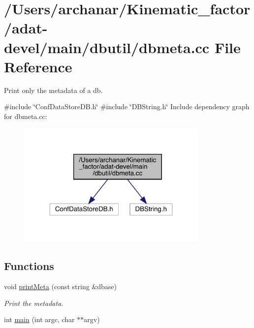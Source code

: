 \hypertarget{adat-devel_2main_2dbutil_2dbmeta_8cc}{}\section{/\+Users/archanar/\+Kinematic\+\_\+factor/adat-\/devel/main/dbutil/dbmeta.cc File Reference}
\label{adat-devel_2main_2dbutil_2dbmeta_8cc}


Print only the metadata of a db.  


{\ttfamily \#include \char`\"{}Conf\+Data\+Store\+D\+B.\+h\char`\"{}}\newline
{\ttfamily \#include \char`\"{}D\+B\+String.\+h\char`\"{}}\newline
Include dependency graph for dbmeta.\+cc\+:
\nopagebreak
\begin{figure}[H]
\begin{center}
\leavevmode
\includegraphics[width=266pt]{dd/d81/adat-devel_2main_2dbutil_2dbmeta_8cc__incl}
\end{center}
\end{figure}
\subsection*{Functions}
\begin{DoxyCompactItemize}
\item 
void \mbox{\hyperlink{adat-devel_2main_2dbutil_2dbmeta_8cc_a0577d572da492642f9cf5f404d0116d9}{print\+Meta}} (const string \&dbase)
\begin{DoxyCompactList}\small\item\em Print the metadata. \end{DoxyCompactList}\item 
int \mbox{\hyperlink{adat-devel_2main_2dbutil_2dbmeta_8cc_a3c04138a5bfe5d72780bb7e82a18e627}{main}} (int argc, char $\ast$$\ast$argv)
\end{DoxyCompactItemize}


